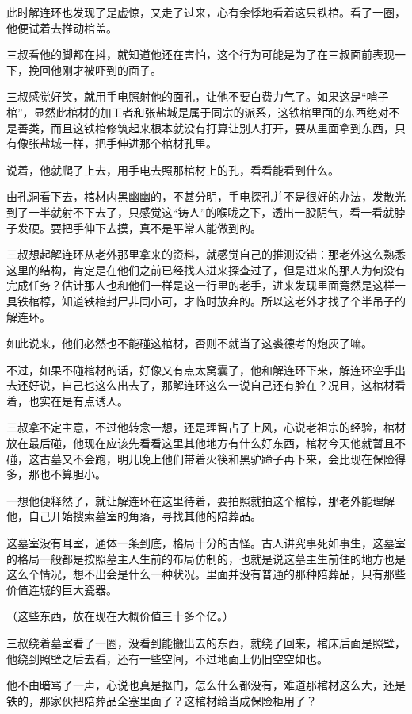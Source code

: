 此时解连环也发现了是虚惊，又走了过来，心有余悸地看着这只铁棺。看了一圈，他便试着去推动棺盖。

三叔看他的脚都在抖，就知道他还在害怕，这个行为可能是为了在三叔面前表现一下，挽回他刚才被吓到的面子。

三叔感觉好笑，就用手电照射他的面孔，让他不要白费力气了。如果这是“哨子棺”，显然此棺材的加工者和张盐城是属于同宗的派系，这铁棺里面的东西绝对不是善类，而且这铁棺修筑起来根本就没有打算让别人打开，要从里面拿到东西，只有像张盐城一样，把手伸进那个棺材孔里。

说着，他就爬了上去，用手电去照那棺材上的孔，看看能看到什么。

由孔洞看下去，棺材内黑幽幽的，不甚分明，手电探孔并不是很好的办法，发散光到了一半就射不下去了，只感觉这“铸人”的喉咙之下，透出一股阴气，看一看就脖子发硬。要把手伸下去摸，真不是平常人能做到的。

三叔想起解连环从老外那里拿来的资料，就感觉自己的推测没错：那老外这么熟悉这里的结构，肯定是在他们之前已经找人进来探查过了，但是进来的那人为何没有完成任务？估计那人也和他们一样是这一行里的老手，进来发现里面竟然是这样一具铁棺椁，知道铁棺封尸非同小可，才临时放弃的。所以这老外才找了个半吊子的解连环。

如此说来，他们必然也不能碰这棺材，否则不就当了这裘德考的炮灰了嘛。

不过，如果不碰棺材的话，好像又有点太窝囊了，他和解连环下来，解连环空手出去还好说，自己也这么出去了，那解连环这么一说自己还有脸在？况且，这棺材看着，也实在是有点诱人。

三叔拿不定主意，不过他转念一想，还是理智占了上风，心说老祖宗的经验，棺材放在最后碰，他现在应该先看看这里其他地方有什么好东西，棺材今天他就暂且不碰，这古墓又不会跑，明儿晚上他们带着火筷和黑驴蹄子再下来，会比现在保险得多，那也不算胆小。

一想他便释然了，就让解连环在这里待着，要拍照就拍这个棺椁，那老外能理解他，自己开始搜索墓室的角落，寻找其他的陪葬品。

这墓室没有耳室，通体一条到底，格局十分的古怪。古人讲究事死如事生，这墓室的格局一般都是按照墓主人生前的布局仿制的，也就是说这墓主生前住的地方也是这么个情况，想不出会是什么一种状况。里面并没有普通的那种陪葬品，只有那些价值连城的巨大瓷器。

（这些东西，放在现在大概价值三十多个亿。）

三叔绕着墓室看了一圈，没看到能搬出去的东西，就绕了回来，棺床后面是照壁，他绕到照壁之后去看，还有一些空间，不过地面上仍旧空空如也。

他不由暗骂了一声，心说也真是抠门，怎么什么都没有，难道那棺材这么大，还是铁的，那家伙把陪葬品全塞里面了？这棺材给当成保险柜用了？

